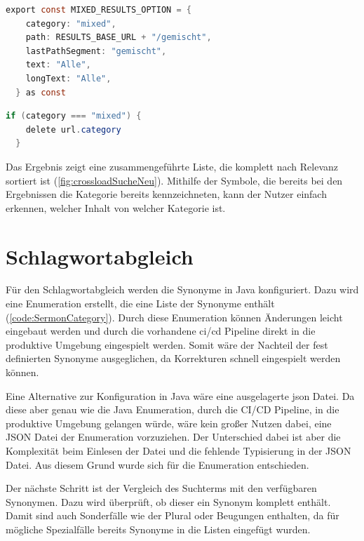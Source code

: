 \begin{lstlisting}[language=Java, title={Erstellen der gemischten Kategorie \cite{frontend2022}}]
  export const MIXED_RESULTS_OPTION = {
    category: "mixed",
    path: RESULTS_BASE_URL + "/gemischt",
    lastPathSegment: "gemischt",
    text: "Alle",
    longText: "Alle",
  } as const
\end{lstlisting}

\begin{lstlisting}[language=Java, title={Löschen der Kategorie aus den API Parametern \cite{frontend2022}}]
  if (category === "mixed") {
    delete url.category
  }
\end{lstlisting}

Das Ergebnis zeigt eine zusammengeführte Liste, die komplett nach Relevanz sortiert ist (\ref{fig:crossloadSucheNeu}).
Mithilfe der Symbole, die bereits bei den Ergebnissen die Kategorie bereits kennzeichneten, kann der Nutzer einfach erkennen, welcher Inhalt von welcher Kategorie ist.

\section{Schlagwortabgleich}
\label{sec:devKeywords}

Für den Schlagwortabgleich werden die Synonyme in Java konfiguriert.
Dazu wird eine Enumeration erstellt, die eine Liste der Synonyme enthält (\ref{code:SermonCategory}).
Durch diese Enumeration können Änderungen leicht eingebaut werden und durch die vorhandene \gls{ci}/\gls{cd} Pipeline direkt in die produktive Umgebung eingespielt werden.
Somit wäre der Nachteil der fest definierten Synonyme ausgeglichen, da Korrekturen schnell eingespielt werden können.

Eine Alternative zur Konfiguration in Java wäre eine ausgelagerte \gls{json} Datei.
Da diese aber genau wie die Java Enumeration, durch die CI/CD Pipeline, in die produktive Umgebung gelangen würde, wäre kein großer Nutzen dabei, eine JSON Datei der Enumeration vorzuziehen.
Der Unterschied dabei ist aber die Komplexität beim Einlesen der Datei und die fehlende Typisierung in der JSON Datei.
Aus diesem Grund wurde sich für die Enumeration entschieden.

Der nächste Schritt ist der Vergleich des Suchterms mit den verfügbaren Synonymen.
Dazu wird überprüft, ob dieser ein Synonym komplett enthält.
Damit sind auch Sonderfälle wie der Plural oder Beugungen enthalten, da für mögliche Spezialfälle bereits Synonyme in die Listen eingefügt wurden.

